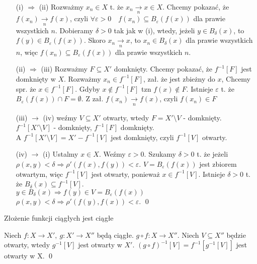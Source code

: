 \begin{dd} \hfill 
    \begin{itemize} 
        \item[(i) $\Rightarrow$ (ii)] Rozważmy $x_n \in X$ t. że $x_n \underset{n}{\rightarrow} x \in X$. 
        Chcemy pokazać, że $f(x_n) \underset{n}{\rightarrow} f(x)$, czyli $\forall \varepsilon > 0 \quad f(x_n) \subseteq B_\varepsilon (f(x))$ dla prawie wszystkich $n$.
        Dobieramy $\delta > 0$ tak jak w (i), wtedy, jeżeli $y \in B_\delta(x)$, to $f(y) \in B_\varepsilon (f(x))$. Skoro $x_n \underset{n}{\rightarrow} x$, 
        to $x_n \in B_\delta (x)$ dla prawie wszystkich $n$, więc $f(x_n) \subseteq B_\varepsilon (f(x))$ dla prawie wszystkich $n$.
        \item[(ii) $\Rightarrow$ (iii)] Rozważmy $F \subseteq X'$ domknięty. Chcemy pokazać, że $f^{-1}[F]$ jest domknięty w $X$. Rozważmy $x_n \in f^{-1}[F]$, zał. że jest zbieżny do $x$, Chcemy spr. że $x \in f^{-1}[F]$.
        Gdyby $x \notin f^{-1}[F]$ tzn $f(x) \notin F$. Istnieje $\varepsilon$ t. że $B_\varepsilon (f(x)) \cap F = \emptyset$. 
        Z zał. $f(x_n) \underset{n}{\rightarrow} f(x)$, czyli $f(x_n) \in F$ \lightning
        \item[(iii) $\rightarrow$ (iv)] weźmy $V \subseteq X'$ otwarty, wtedy $F = X' \setminus V$ - domknięty. $ f^{-1} [X' \setminus V]$ - domknięty, $f^{-1}[F]$ domknięty. \\
        A $f^{-1}[X' \setminus V] = X' - f^{-1}[V]$ jest domknięty, czyli $f^{-1}[V]$ otwarty. \lightning
        \item[(iv) $\rightarrow$ (i)] Ustalmy $x \in X$. Weźmy $\varepsilon > 0$. Szukamy $\delta > 0$ t. że jeżeli $\rho (x,y) < \delta \Rightarrow \rho ' (f(x),f(y)) < \varepsilon$.
        $ V = B_\varepsilon (f(x))$ jest zbiorem otwartym, więc $f^{-1}[V]$ jest otwarty, ponieważ $x \in f^{-1}[V]$.
        Istnieje $\delta > 0$ t. że $B_\delta (x) \subseteq f^{-1}[V]$. \\
        $y \in B_\delta (x) \Rightarrow f(y) \in V = B_\varepsilon (f(x))$\\
        $\rho (x,y) < \delta \Rightarrow \rho'(f(y),f(x)) < \varepsilon$. \hfill \qed
    \end{itemize} 
\end{dd} 

\begin{tw} Złożenie funkcji ciągłych jest ciągłe \end{tw}
\begin{dd} 
    Niech $f: X \rightarrow X', \ g: X' \rightarrow X''$ będą ciągłe. $g \circ f: X \rightarrow X''$. Niech $V \subseteq X''$ będzie otwarty, wtedy $g^{-1}[V]$ jest otwarty w $X'$.
    $(g \circ f)^{-1}[V] = f^{-1}[g^{-1}[V]]$ jest otwarty w X. \hfill \qed
\end{dd} 


